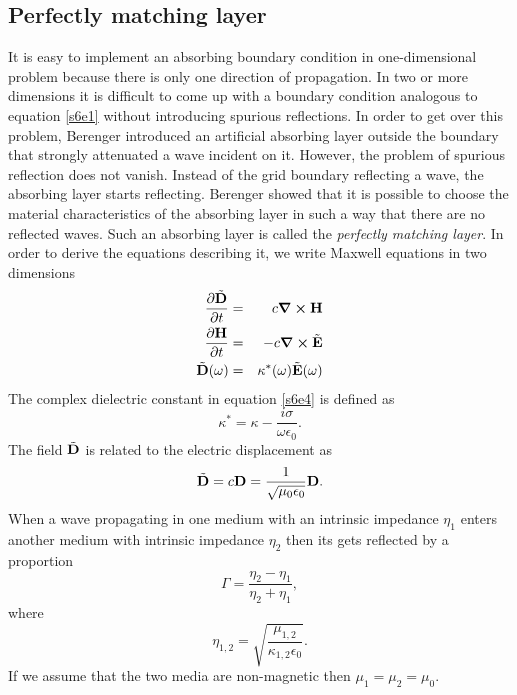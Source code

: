 \documentclass[11pt]{article}
\numberwithin{equation}{section}
\begin{document}
\subsection{Perfectly matching layer}
It is easy to implement an absorbing boundary condition in one-dimensional
problem because there is only one direction of propagation. In two or more
dimensions it is difficult to come up with a boundary condition analogous to
equation \eqref{s6e1} without introducing spurious reflections. In order to
get over this problem, Berenger \cite{berenger1994perfectly} introduced an
artificial absorbing layer outside the boundary that strongly attenuated a
wave incident on it. However, the problem of spurious reflection does not 
vanish. Instead of the grid boundary reflecting a wave, the absorbing layer
starts reflecting. Berenger showed that it is possible to choose the material
characteristics of the absorbing layer in such a way that there are no 
reflected waves. Such an absorbing layer is called the \emph{perfectly matching
layer}. In order to derive the equations describing it, we write Maxwell
equations in two dimensions
\begin{eqnarray}
\pdv{\tilde{\vb{D}}}{t} &=& c\curl\vb{H} \label{s6e2} \\
\pdv{\vb{H}}{t} &=& -c\curl\tilde{\vb{E}} \label{s6e3} \\
\tilde{\vb{D}}(\omega) &=& \kappa^\ast(\omega)\tilde{\vb{E}}(\omega)
\label{s6e4}
\end{eqnarray}
The complex dielectric constant in equation \eqref{s6e4} is defined as
\begin{equation}\label{s6e5}
\kappa^\ast = \kappa - \frac{i\sigma}{\omega\epsilon_0}.
\end{equation}
The field $\tilde{\vb{D}}$ is related to the electric displacement as
\begin{equation}\label{s6e6}
\tilde{\vb{D}} = c\vb{D} = \frac{1}{\sqrt{\mu_0\epsilon_0}}\vb{D}.
\end{equation}
When a wave propagating in one medium with an intrinsic impedance $\eta_1$
enters another medium with intrinsic impedance $\eta_2$ then its gets
reflected by a proportion
\begin{equation}\label{s6e7}
\Gamma = \frac{\eta_2 - \eta_1}{\eta_2 + \eta_1},
\end{equation}
where
\begin{equation}\label{s6e8}
\eta_{1,2} = \sqrt{\frac{\mu_{1,2}}{\kappa_{1,2}\epsilon_0}}.
\end{equation}
If we assume that the two media are non-magnetic then $\mu_1 = \mu_2 = \mu_0$.
\end{document}
